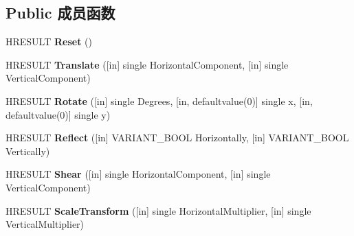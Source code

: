 \subsection*{Public 成员函数}
\begin{DoxyCompactItemize}
\item 
\mbox{\label{interface_m_s_i_n_k_a_u_t_lib_1_1_i_ink_transform_adf86c0bb9afdfe9344bb7dff264c5162}} 
H\+R\+E\+S\+U\+LT {\bfseries Reset} ()
\item 
\mbox{\label{interface_m_s_i_n_k_a_u_t_lib_1_1_i_ink_transform_a6300630af905457d0438466ca125c1a5}} 
H\+R\+E\+S\+U\+LT {\bfseries Translate} (\mbox{[}in\mbox{]} single Horizontal\+Component, \mbox{[}in\mbox{]} single Vertical\+Component)
\item 
\mbox{\label{interface_m_s_i_n_k_a_u_t_lib_1_1_i_ink_transform_a6701ae3d5e8b9b9f220679e8577d7f19}} 
H\+R\+E\+S\+U\+LT {\bfseries Rotate} (\mbox{[}in\mbox{]} single Degrees, \mbox{[}in, defaultvalue(0)\mbox{]} single x, \mbox{[}in, defaultvalue(0)\mbox{]} single y)
\item 
\mbox{\label{interface_m_s_i_n_k_a_u_t_lib_1_1_i_ink_transform_ac4294d3c1d9d4e2db01f8e96d1fce9e6}} 
H\+R\+E\+S\+U\+LT {\bfseries Reflect} (\mbox{[}in\mbox{]} V\+A\+R\+I\+A\+N\+T\+\_\+\+B\+O\+OL Horizontally, \mbox{[}in\mbox{]} V\+A\+R\+I\+A\+N\+T\+\_\+\+B\+O\+OL Vertically)
\item 
\mbox{\label{interface_m_s_i_n_k_a_u_t_lib_1_1_i_ink_transform_a6580f41891b1089a38ec384ef90a1da0}} 
H\+R\+E\+S\+U\+LT {\bfseries Shear} (\mbox{[}in\mbox{]} single Horizontal\+Component, \mbox{[}in\mbox{]} single Vertical\+Component)
\item 
\mbox{\label{interface_m_s_i_n_k_a_u_t_lib_1_1_i_ink_transform_a2691985dfb154ebd09a3e6682bdf9c9a}} 
H\+R\+E\+S\+U\+LT {\bfseries Scale\+Transform} (\mbox{[}in\mbox{]} single Horizontal\+Multiplier, \mbox{[}in\mbox{]} single Vertical\+Multiplier)
\item 
\mbox{\label{interface_m_s_i_n_k_a_u_t_lib_1_1_i_ink_transform_abb1c70dd21b666b78f9fe779afba224d}} 

\end{DoxyCompactItemize}
